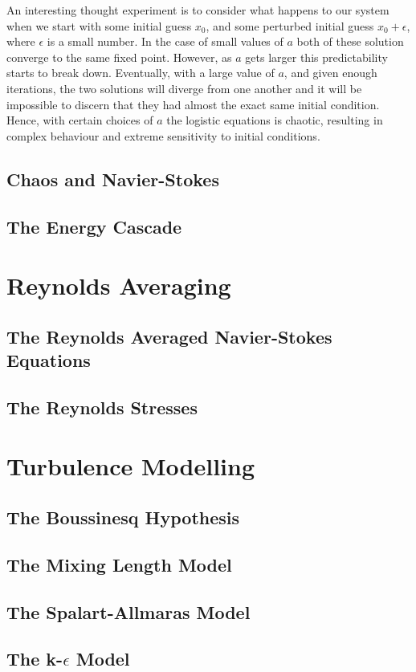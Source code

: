 An interesting thought experiment is to consider what happens to our system when we start with some initial guess $x_0$, and some perturbed initial guess $x_0 + \epsilon$, where $\epsilon$ is a small number. In the case of small values of $a$ both of these solution converge to the same fixed point. However, as $a$ gets larger this predictability starts to break down. Eventually, with a large value of $a$, and given enough iterations, the two solutions will diverge from one another and it will be impossible to discern that they had almost the exact same initial condition. Hence, with certain choices of $a$ the logistic equations is chaotic, resulting in complex behaviour and extreme sensitivity to initial conditions. 

\subsection{Chaos and Navier-Stokes}
\subsection{The Energy Cascade}
\section{Reynolds Averaging}
\subsection{The Reynolds Averaged Navier-Stokes Equations}
\subsection{The Reynolds Stresses}
\section{Turbulence Modelling}
\subsection{The Boussinesq Hypothesis}
\subsection{The Mixing Length Model}
\subsection{The Spalart-Allmaras Model}
\subsection{The k-$\epsilon$ Model}
